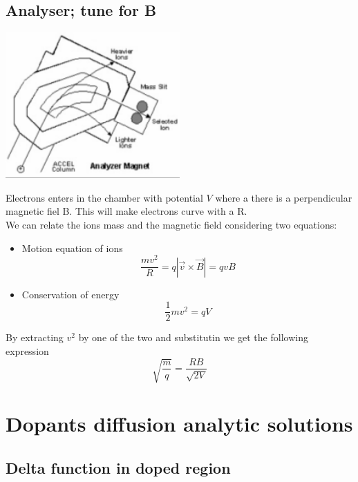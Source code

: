 
\subsection{Analyser; tune for B}

\centering
\includegraphics[width=0.5\textwidth]{B-curve.png}\\
\raggedright

Electrons enters in the chamber with potential $V$ where a there is a perpendicular magnetic fiel B. This will make electrons curve with a R.\\
We can relate the ions mass and the magnetic field considering two equations:\begin{itemize}
\item Motion equation of ions
\begin{equation}
\frac{mv^2}{R}=q|\vec{v}\times \vec{B}|=qvB
\end{equation}
\item Conservation of energy
\begin{equation}
\frac{1}{2}mv^2=qV
\end{equation}
\end{itemize}
By extracting $v^2$ by one of the two and substitutin we get the following expression
\begin{equation}
\sqrt{\frac{m}{q}}=\frac{RB}{\sqrt{2V}}
\end{equation}

\section{Dopants diffusion analytic solutions}

\subsection{Delta function in doped region}

